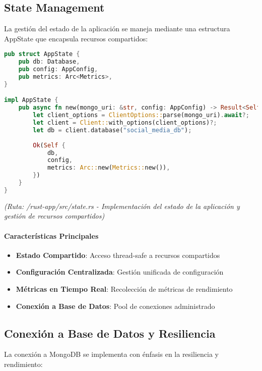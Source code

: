 \documentclass[12pt,letterpaper]{article}
\begin{document}
\subsection{State Management}
La gestión del estado de la aplicación se maneja mediante una estructura AppState que encapsula recursos compartidos:

\begin{lstlisting}[language=rust]
pub struct AppState {
    pub db: Database,
    pub config: AppConfig,
    pub metrics: Arc<Metrics>,
}

impl AppState {
    pub async fn new(mongo_uri: &str, config: AppConfig) -> Result<Self, AppError> {
        let client_options = ClientOptions::parse(mongo_uri).await?;
        let client = Client::with_options(client_options)?;
        let db = client.database("social_media_db");
        
        Ok(Self {
            db,
            config,
            metrics: Arc::new(Metrics::new()),
        })
    }
}
\end{lstlisting}
\textit{(Ruta: /rust-app/src/state.rs - Implementación del estado de la aplicación y gestión de recursos compartidos)}

\paragraph{Características Principales}
\begin{itemize}
    \item \textbf{Estado Compartido}: Acceso thread-safe a recursos compartidos
    \item \textbf{Configuración Centralizada}: Gestión unificada de configuración
    \item \textbf{Métricas en Tiempo Real}: Recolección de métricas de rendimiento
    \item \textbf{Conexión a Base de Datos}: Pool de conexiones administrado
\end{itemize}

\subsection{Conexión a Base de Datos y Resiliencia}
La conexión a MongoDB se implementa con énfasis en la resiliencia y rendimiento:
\end{document}
